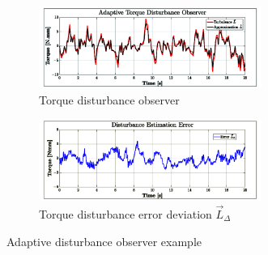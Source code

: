 \begin{figure}[hbtp]
\vspace{-6pt}
\centering
\begin{subfigure}{\textwidth}
\centering
\includegraphics[width=0.8\textwidth]{graphs/disturbance_L}
\vspace{-8pt}
\caption{Torque disturbance observer}
\label{fig:disturbance_L}
\end{subfigure}
\begin{subfigure}{\textwidth}
\centering
\includegraphics[width=0.8\textwidth]{graphs/error_LR}
\vspace{-8pt}
\caption{Torque disturbance error deviation $\vec{L}_\Delta$}
\label{fig:error_LR}
\end{subfigure}
\vspace{-6pt}
\caption{Adaptive disturbance observer example}
\label{fig:example_L}
\vspace{-25pt}
\end{figure}
